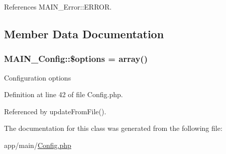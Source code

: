 References MAIN\_\-Error::ERROR.

\subsection{Member Data Documentation}
\hypertarget{classMAIN__Config_a25b93ec03bb1cffdfaf33b9f9b60e853}{
\subsubsection[{\$options}]{\setlength{\rightskip}{0pt plus 5cm}MAIN\_\-Config::\$options = array()}}
\label{dc/d96/classMAIN__Config_a25b93ec03bb1cffdfaf33b9f9b60e853}
Configuration options 

Definition at line 42 of file Config.php.

Referenced by updateFromFile().

The documentation for this class was generated from the following file:\begin{DoxyCompactItemize}
\item 
app/main/\hyperlink{Config_8php}{Config.php}\end{DoxyCompactItemize}
